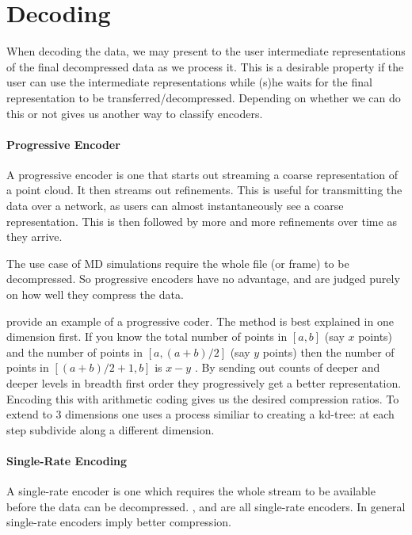 \documentclass[a4paper]{report}
\begin{document}
\section{Decoding}

When decoding the data, we may present to the user intermediate
representations of the final decompressed data as we process it. This is a
desirable property if the user can use the intermediate representations while
(s)he waits for the final representation to be
transferred/decompressed. Depending on whether we can do this or not gives us
another way to classify encoders.

\paragraph{Progressive Encoder}
A progressive encoder is one that starts out streaming a coarse representation
of a point cloud. It then streams out refinements. This is useful for
transmitting the data over a network, as users can almost instantaneously see
a coarse representation. This is then followed by more and more refinements
over time as they arrive.

The use case of MD simulations require the whole file (or frame) to be
decompressed. So progressive encoders have no advantage, and are judged purely
on how well they compress the data.

\citet{devillers2000gci} provide an example of a progressive coder. The method
is best explained in one dimension first. If you know the total number of
points in $[a, b]$ (say $x$ points) and the number of points in $[a, (a+b)/2]$
(say $y$ points) then the number of points in $[(a+b)/2+1, b]$ is $x - y$ . By
sending out counts of deeper and deeper levels in breadth first order they
progressively get a better representation. Encoding this with arithmetic
coding gives us the desired compression ratios. To extend to 3 dimensions one
uses a process similiar to creating a kd-tree: at each step subdivide along a
different dimension.

\paragraph{Single-Rate Encoding}
A single-rate encoder is one which requires the whole stream to be available
before the data can be decompressed. \citet{omeltchenko2000sls},
\citet{gumholdcomp} and \citet{merrycomp} are all single-rate encoders. In
general single-rate encoders imply better compression.
\end{document}
